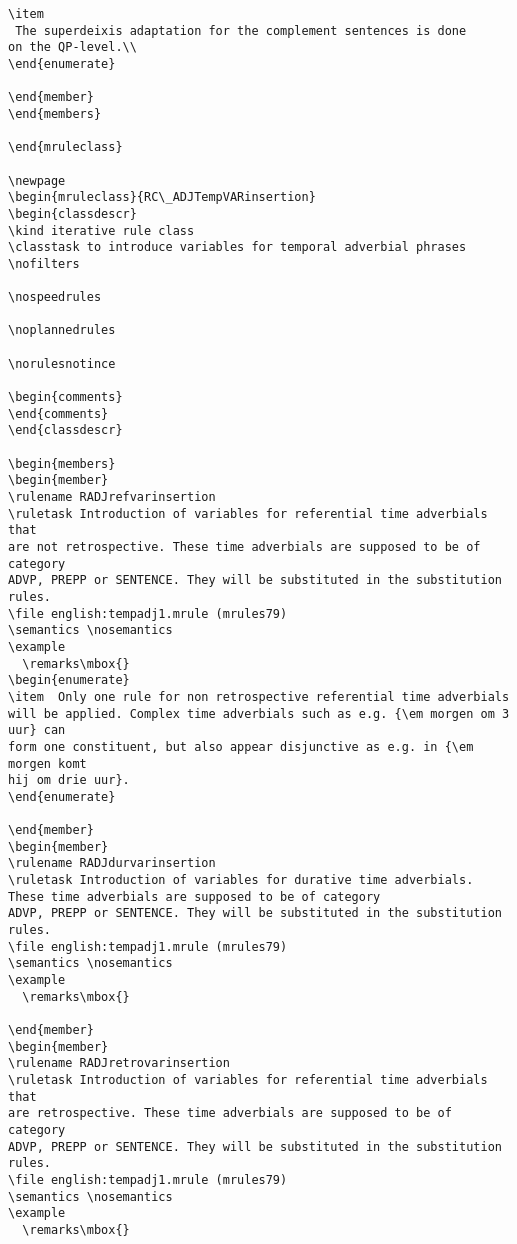 \begin{verbatim}
\item 
 The superdeixis adaptation for the complement sentences is done
on the QP-level.\\
\end{enumerate}

\end{member}
\end{members}

\end{mruleclass}

\newpage
\begin{mruleclass}{RC\_ADJTempVARinsertion}
\begin{classdescr}
\kind iterative rule class
\classtask to introduce variables for temporal adverbial phrases
\nofilters

\nospeedrules

\noplannedrules

\norulesnotince

\begin{comments}
\end{comments}
\end{classdescr}

\begin{members}
\begin{member}
\rulename RADJrefvarinsertion
\ruletask Introduction of variables for referential time adverbials that 
are not retrospective. These time adverbials are supposed to be of category 
ADVP, PREPP or SENTENCE. They will be substituted in the substitution rules.
\file english:tempadj1.mrule (mrules79)
\semantics \nosemantics
\example
  \remarks\mbox{}
\begin{enumerate}
\item  Only one rule for non retrospective referential time adverbials 
will be applied. Complex time adverbials such as e.g. {\em morgen om 3 uur} can 
form one constituent, but also appear disjunctive as e.g. in {\em morgen komt 
hij om drie uur}. 
\end{enumerate}

\end{member}
\begin{member}
\rulename RADJdurvarinsertion
\ruletask Introduction of variables for durative time adverbials.
These time adverbials are supposed to be of category 
ADVP, PREPP or SENTENCE. They will be substituted in the substitution rules.
\file english:tempadj1.mrule (mrules79)
\semantics \nosemantics
\example
  \remarks\mbox{}

\end{member}
\begin{member}
\rulename RADJretrovarinsertion
\ruletask Introduction of variables for referential time adverbials that 
are retrospective. These time adverbials are supposed to be of category 
ADVP, PREPP or SENTENCE. They will be substituted in the substitution rules.
\file english:tempadj1.mrule (mrules79)
\semantics \nosemantics
\example
  \remarks\mbox{}


\end{verbatim}
